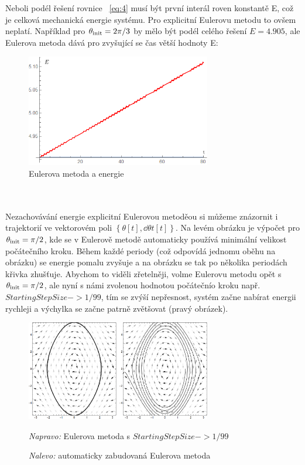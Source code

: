 \documentclass[reqno, a4paper]{amsart}
\begin{document}
Neboli podél řešení rovnice ~\eqref{eq:4} musí být první interál roven konstantě E, což je celková mechanická energie systému.
Pro explicitní Eulerovu metodu to ovšem neplatí. Například pro $\theta_{\mathrm{init}} =2\pi/3$ by mělo být podél celého řešení $E=4.905$, ale Eulerova metoda dává pro zvyšující se čas větší hodnoty E:
\begin{figure}[h]
	\centering
	\includegraphics[width=0.72\textwidth]{energie}
	\caption{Eulerova metoda a energie}  
\end{figure}
\\
\\
Nezachovávání energie explicitní Eulerovou metoděou si můžeme znázornit i trajektorií ve vektorovém poli ${\left\lbrace \theta[t],\dd{\theta}{t}[t]\right\rbrace }$. Na levém obrázku je výpočet pro $\theta_{\mathrm{init}}=\pi/2$, kde se v Eulerově metodě automaticky používá minimální velikost počátečního kroku. Během každé periody (což odpovídá jednomu oběhu na obrázku) se energie pomalu zvyšuje a na obrázku se tak po několika periodách křivka zhušťuje. Abychom to viděli zřetelněji, volme Eulerovu metodu opět s $\theta_{\mathrm{init}}=\pi/2$, ale nyní s námi zvolenou hodnotou počátečnío kroku např. $ StartingStepSize -> 1/99 $, tím se zvýší nepřesnost, systém začne nabírat energii rychleji a výchylka se začne patrně zvětšovat (pravý obrázek).
\begin{figure}[h]
	\centering
	\includegraphics[width=0.72\textwidth]{pole1}
	\caption{\textit{Nalevo:} automaticky zabudovaná Eulerova metoda}  \textit{Napravo:} Eulerova metoda s $StartingStepSize -> 1/99$  
\end{figure}


\end{document}
